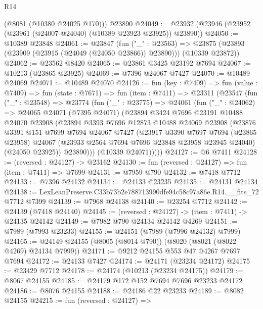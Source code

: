\begin{lexlean}{R14}
\begin{coremodule}
      (@8081 (@10380 @24025 @170)))
    @23890
@24049 := @23932 (@23946 (@23952 (@23961 (@24007 @24040) (@10389 @23923 @23925)) @23890))
@24050 := @10389 @23848
@24061 := @23847
    (fun ("_" : @23563) =>
    @23875 (@23893 (@23909 (@23915 (@24049 (@24050 @23866)) @23890))) (@10339 @23872))
@24062 := @23562 @8420
@24065 := @23861 @3425 @23192 @7694
@24067 := @10213 (@23865 @23925)
@24069 := @7396 @24067 @7427
@24070 := @10489 @24069
@24071 := @10489 @24070
@24126 := fun (key : @7409) =>
  fun (value : @7409) =>
  fun (state : @7671) =>
  fun (item : @7411) =>
  @23311
    (@23547
      (fun ("_" : @23548) =>
      @23774
        (fun ("_" : @23775) =>
        @24061
          (fun ("_" : @24062) =>
          @24065
            @24071
            (@7395 @24071)
            (@23894
              @3424
              @7696
              @23191
              @10488
              @24070
              @23908
              (@23894
                @3393
                @7696
                @12873
                @10488
                @24069
                @23908
                (@23876
                  @3391
                  @151
                  @7699
                  @7694
                  @24067
                  @7427
                  (@23917
                    @3390
                    @7697
                    @7694
                    (@23865 @23958)
                    @24067
                    (@23933 @2564 @7694 @7696 @23848 @23958 @23945 @24040)
                    (@24050 @23925))
                  @23890)))
            (@10339 @24071)))))
@24127 := @6 @7411
@24128 := (reversed : @24127) -> @23162
@24130 := fun (reversed : @24127) => fun (item : @7411) => @7699
@24131 := @7959 @790
@24132 := @7418 @7712
@24133 := @7396 @24132
@24134 := @24133 @23235
@24135 := @24131 @24134
@24138 := LexLeanPreserve.C33b73b2e788713990dfe94c58c97a86e.R14.__fits_72 @7712 @7399
@24139 := @7968 @24138
@24140 := @23254 @7712
@24142 := @24139 (@7418 @24140)
@24145 := (reversed : @24127) -> (item : @7411) -> @24135 @24142
@24149 := @7982 @790 @24134 @24142 @4269
@24151 := @7989 (@7993 @23233)
@24155 := @24151 (@7989 (@7996 @24132) @7999)
@24165 := @24149 @24155 (@8005 (@8014 @790)) (@8020 (@8021 (@8022 @4269) @24134 @7999))
@24171 := @9212 @24155 @553 @47 @4267 @7697 @7694
@24172 := @24133 @7427
@24174 := @24171 (@23234 @24172)
@24175 := @23429 @7712
@24178 := @24174 (@10213 (@23234 @24175))
@24179 := @8067 @24155
@24185 := @24179 @172 @152 @7694 @7696 @23233 @24172
@24186 := @8076 @24155
@24188 := @24186 @22 @23233
@24189 := @8082 @24155
@24215 := fun (reversed : @24127) =>

\end{coremodule}
\end{lexlean}
